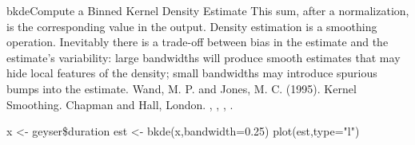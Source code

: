 \begin{Helpfile}{bkde}{Compute a Binned Kernel Density Estimate}
This sum, after a normalization, is the corresponding  value in the output.
Density estimation is a smoothing operation.
Inevitably there is a trade-off between bias in the estimate and the
estimate's variability: large bandwidths will produce smooth estimates that
may hide local features of the density; small bandwidths may introduce
spurious bumps into the estimate.
Wand, M. P. and Jones, M. C. (1995).
Kernel Smoothing.
Chapman and Hall, London.
, , , .
\need 15pt
\vspace{-16pt}
\begin{Example}
x <- geyser\$duration
est <- bkde(x,bandwidth=0.25)
plot(est,type="l")
\end{Example}
\end{Helpfile}
